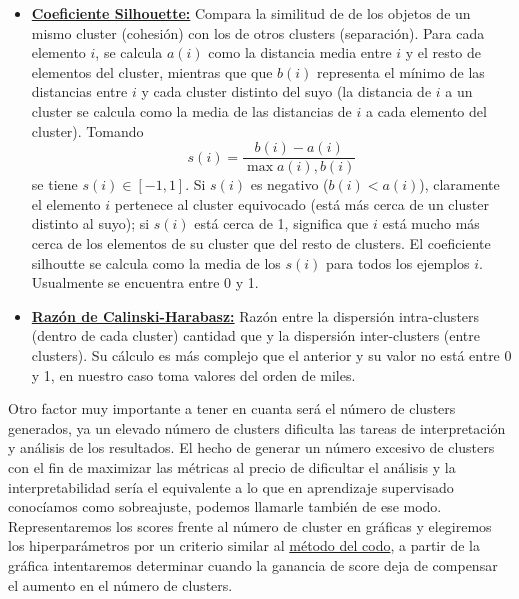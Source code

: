 \documentclass[oneside]{book}
\begin{document}
\begin{itemize}
\item \href{https://en.wikipedia.org/wiki/Silhouette_%28clustering%29}
    {\textbf{Coeficiente Silhouette:}} Compara la similitud de de los
    objetos de un mismo cluster (cohesión) con los de otros clusters
    (separación). Para cada elemento $i$, se calcula $a(i)$ como la
    distancia media entre $i$ y el resto de elementos del cluster,
    mientras que que $b(i)$ representa el mínimo de las distancias
    entre $i$ y cada cluster distinto del suyo (la distancia de $i$ a
    un cluster se calcula como la media de las distancias de $i$ a
    cada elemento del cluster). Tomando
    \[s(i)=\frac{b(i)-a(i)}{\max{a(i),b(i)}}\] se tiene
    $s(i)\in[-1,1]$. Si $s(i)$ es negativo \big($b(i)<a(i)$\big),
    claramente el elemento $i$ pertenece al cluster equivocado (está
    más cerca de un cluster distinto al suyo); si $s(i)$ está cerca de
    1, significa que $i$ está mucho más cerca de los elementos de su
    cluster que del resto de clusters. El coeficiente silhoutte se
    calcula como la media de los $s(i)$ para todos los ejemplos
    $i$. Usualmente se encuentra entre 0 y 1.

  \item
    \href{https://www.tandfonline.com/doi/pdf/10.1080/03610927408827101?needAccess=true}{\textbf{Razón
        de Calinski-Harabasz:}} Razón entre la dispersión
    intra-clusters (dentro de cada cluster) cantidad que y la
    dispersión inter-clusters (entre clusters). Su cálculo es más
    complejo que el anterior y su valor no está entre 0 y 1, en
    nuestro caso toma valores del orden de miles.
  \end{itemize}

  Otro factor muy importante a tener en cuanta será el número de
  clusters generados, ya un elevado número de clusters dificulta las
  tareas de interpretación y análisis de los resultados. El hecho de
  generar un número excesivo de clusters con el fin de maximizar las
  métricas al precio de dificultar el análisis y la interpretabilidad
  sería el equivalente a lo que en aprendizaje supervisado conocíamos
  como sobreajuste, podemos llamarle también de ese
  modo. Representaremos los scores frente al número de cluster en
  gráficas y elegiremos los hiperparámetros por un criterio similar al
  \href{https://en.wikipedia.org/wiki/Elbow_method_%28clustering%29}
    {método del codo}, a partir de la gráfica intentaremos determinar
    cuando la ganancia de score deja de compensar el aumento en el
    número de clusters.
\end{document}
